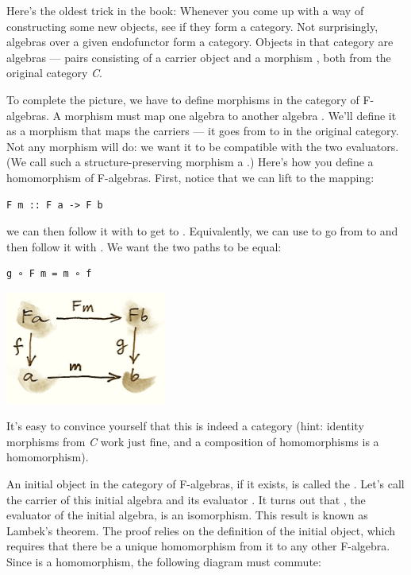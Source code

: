 Here's the oldest trick in the book: Whenever you come up with a way of
constructing some new objects, see if they form a category. Not
surprisingly, algebras over a given endofunctor  form a
category. Objects in that category are algebras --- pairs consisting of
a carrier object  and a morphism
, both from the original category
\emph{C}.

To complete the picture, we have to define morphisms in the category of
F-algebras. A morphism must map one algebra  to another
algebra . We'll define it as a morphism  that
maps the carriers --- it goes from  to  in the
original category. Not any morphism will do: we want it to be compatible
with the two evaluators. (We call such a structure-preserving morphism a
.) Here's how you define a homomorphism of
F-algebras. First, notice that we can lift  to the mapping:

\begin{verbatim}
F m :: F a -> F b
\end{verbatim}

we can then follow it with  to get to .
Equivalently, we can use  to go from  to
 and then follow it with . We want the two paths to
be equal:

\begin{verbatim}
g ∘ F m = m ∘ f
\end{verbatim}

\includegraphics[width=2.09375in]{images/alg.png}

It's easy to convince yourself that this is indeed a category (hint:
identity morphisms from \emph{C} work just fine, and a composition of
homomorphisms is a homomorphism).

An initial object in the category of F-algebras, if it exists, is called
the . Let's call the carrier of this initial
algebra  and its evaluator
. It turns out that ,
the evaluator of the initial algebra, is an isomorphism. This result is
known as Lambek's theorem. The proof relies on the definition of the
initial object, which requires that there be a unique homomorphism
 from it to any other F-algebra. Since  is a
homomorphism, the following diagram must commute:

